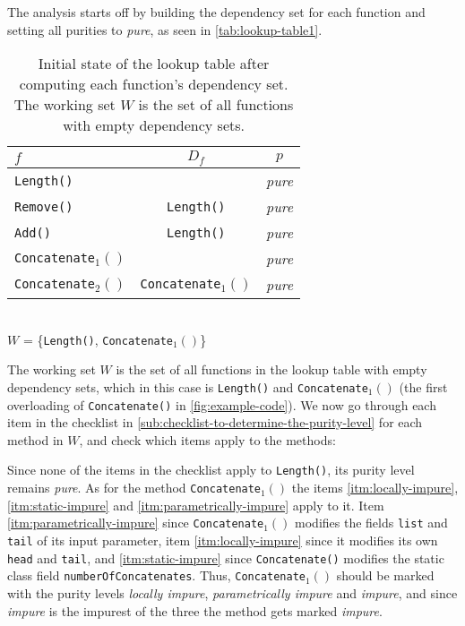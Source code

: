 \documentclass[a4paper,12pt]{article}
\begin{document}
The analysis starts off by building the dependency set for each function and setting all purities to \textit{pure}, as seen in \autoref{tab:lookup-table1}.

\begin{table}[H]
  \caption{Initial state of the lookup table after computing each function's dependency set. The working set $W$ is the set of all functions with empty dependency sets.}
  \label{tab:lookup-table1}
  \centering
  \begin{tabular}{|l|c|c|}
    \hline
    $f$                         & $D_f$                     & $p$    \\ \hline
    \texttt{Length()}           &                           & \textit{pure} \\
    \texttt{Remove()}           & \texttt{Length()}         & \textit{pure} \\
    \texttt{Add()}              & \texttt{Length()}         & \textit{pure} \\
    \texttt{Concatenate$_1()$}   &                           & \textit{pure} \\
    \texttt{Concatenate$_2()$}   & \texttt{Concatenate$_1()$} & \textit{pure} \\ \hline
  \end{tabular}
  \\
  $W$ = \{\texttt{Length()}, \texttt{Concatenate$_1()$}\}
\end{table}

The working set $W$ is the set of all functions in the lookup table with empty dependency sets, which in this case is \texttt{Length()} and \texttt{Concatenate$_1()$} (the first overloading of \texttt{Concatenate()} in \autoref{fig:example-code}). We now go through each item in the checklist in \autoref{sub:checklist-to-determine-the-purity-level} for each method in $W$, and check which items apply to the methods:

Since none of the items in the checklist apply to \texttt{Length()}, its purity level remains \textit{pure}. As for the method \texttt{Concatenate$_1()$} the items \ref{itm:locally-impure}, \ref{itm:static-impure} and \ref{itm:parametrically-impure} apply to it. Item \ref{itm:parametrically-impure} since \texttt{Concatenate$_1()$} modifies the fields \texttt{list} and \texttt{tail} of its input parameter, item \autoref{itm:locally-impure} since it modifies its own \texttt{head} and \texttt{tail}, and \autoref{itm:static-impure} since \texttt{Concatenate()} modifies the static class field \texttt{numberOfConcatenates}. Thus, \texttt{Concatenate$_1()$} should be marked with the purity levels \textit{locally impure}, \textit{parametrically impure} and \textit{impure}, and since \textit{impure} is the impurest of the three the method gets marked \textit{impure}.
\end{document}
